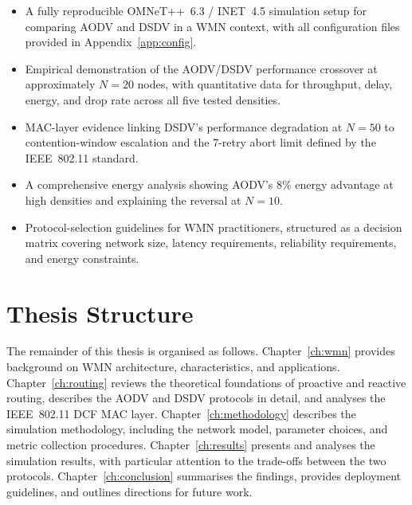 \begin{itemize}
  \item A fully reproducible OMNeT++~6.3 / INET~4.5 simulation setup for comparing
    AODV and DSDV in a WMN context, with all configuration files provided in
    Appendix~\ref{app:config}.
  \item Empirical demonstration of the AODV/DSDV performance crossover at approximately
    $N = 20$ nodes, with quantitative data for throughput, delay, energy, and drop rate
    across all five tested densities.
  \item MAC-layer evidence linking DSDV's performance degradation at $N = 50$ to
    contention-window escalation and the 7-retry abort limit defined by the
    IEEE~802.11 standard.
  \item A comprehensive energy analysis showing AODV's 8\% energy advantage at high
    densities and explaining the reversal at $N = 10$.
  \item Protocol-selection guidelines for WMN practitioners, structured as a decision
    matrix covering network size, latency requirements, reliability requirements, and
    energy constraints.
\end{itemize}

\section{Thesis Structure}

The remainder of this thesis is organised as follows. Chapter~\ref{ch:wmn} provides
background on WMN architecture, characteristics, and applications. Chapter~\ref{ch:routing}
reviews the theoretical foundations of proactive and reactive routing, describes the AODV
and DSDV protocols in detail, and analyses the IEEE~802.11 DCF MAC layer.
Chapter~\ref{ch:methodology} describes the simulation methodology, including the network
model, parameter choices, and metric collection procedures. Chapter~\ref{ch:results}
presents and analyses the simulation results, with particular attention to the trade-offs
between the two protocols. Chapter~\ref{ch:conclusion} summarises the findings, provides
deployment guidelines, and outlines directions for future work.
